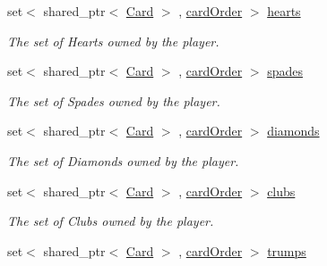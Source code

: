 \begin{DoxyCompactItemize}
\item 
\hypertarget{classPlayer_afab8e372cfef87440bc42168d5fa0f6a}{set$<$ shared\-\_\-ptr$<$ \hyperlink{classCard}{\-Card} $>$\*
, \hyperlink{structPlayer_1_1cardOrder}{card\-Order} $>$ \hyperlink{classPlayer_afab8e372cfef87440bc42168d5fa0f6a}{hearts}}\label{classPlayer_afab8e372cfef87440bc42168d5fa0f6a}

\begin{DoxyCompactList}\small\item\em \-The set of \-Hearts owned by the player. \end{DoxyCompactList}\item 
\hypertarget{classPlayer_a89177ee8076c1a3411a74b2b1d68156c}{set$<$ shared\-\_\-ptr$<$ \hyperlink{classCard}{\-Card} $>$\*
, \hyperlink{structPlayer_1_1cardOrder}{card\-Order} $>$ \hyperlink{classPlayer_a89177ee8076c1a3411a74b2b1d68156c}{spades}}\label{classPlayer_a89177ee8076c1a3411a74b2b1d68156c}

\begin{DoxyCompactList}\small\item\em \-The set of \-Spades owned by the player. \end{DoxyCompactList}\item 
\hypertarget{classPlayer_a3ad0f1545e0653635eac5ced5c31dc0b}{set$<$ shared\-\_\-ptr$<$ \hyperlink{classCard}{\-Card} $>$\*
, \hyperlink{structPlayer_1_1cardOrder}{card\-Order} $>$ \hyperlink{classPlayer_a3ad0f1545e0653635eac5ced5c31dc0b}{diamonds}}\label{classPlayer_a3ad0f1545e0653635eac5ced5c31dc0b}

\begin{DoxyCompactList}\small\item\em \-The set of \-Diamonds owned by the player. \end{DoxyCompactList}\item 
\hypertarget{classPlayer_ad3f3acdaf6ee318ba528e82e1c188820}{set$<$ shared\-\_\-ptr$<$ \hyperlink{classCard}{\-Card} $>$\*
, \hyperlink{structPlayer_1_1cardOrder}{card\-Order} $>$ \hyperlink{classPlayer_ad3f3acdaf6ee318ba528e82e1c188820}{clubs}}\label{classPlayer_ad3f3acdaf6ee318ba528e82e1c188820}

\begin{DoxyCompactList}\small\item\em \-The set of \-Clubs owned by the player. \end{DoxyCompactList}\item 
\hypertarget{classPlayer_a66b3455fc8c6685a78eb193a015a07a0}{set$<$ shared\-\_\-ptr$<$ \hyperlink{classCard}{\-Card} $>$\*
, \hyperlink{structPlayer_1_1cardOrder}{card\-Order} $>$ \hyperlink{classPlayer_a66b3455fc8c6685a78eb193a015a07a0}{trumps}}\label{classPlayer_a66b3455fc8c6685a78eb193a015a07a0}


\end{DoxyCompactItemize}
